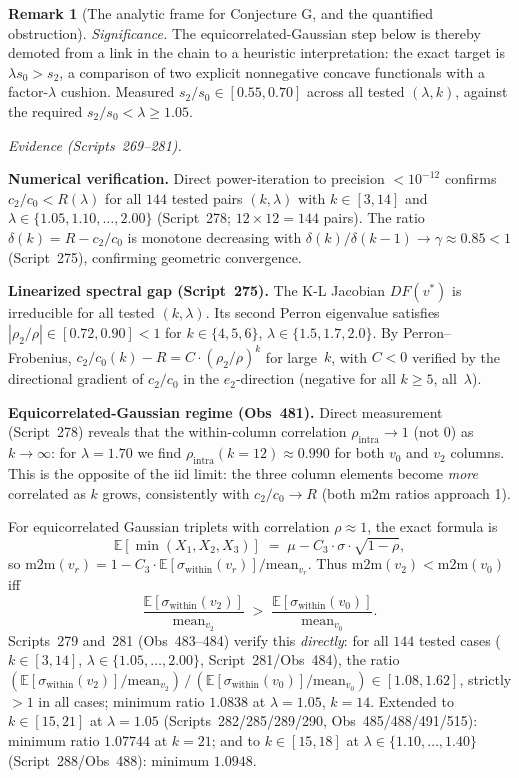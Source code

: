 \documentclass[11pt]{article}
\theoremstyle{definition}
\newtheorem{remark}[theorem]{Remark}
\begin{document}
\begin{remark}[The analytic frame for Conjecture G, and the quantified
obstruction]
\emph{Significance.} The equicorrelated-Gaussian step below is thereby demoted from a
link in the chain to a heuristic interpretation: the exact target is $\lambda s_0>s_2$,
a comparison of two explicit nonnegative concave functionals with a factor-$\lambda$
cushion. Measured $s_2/s_0 \in [0.55,0.70]$ across all tested $(\lambda,k)$,
against the required $s_2/s_0 < \lambda \ge 1.05$.

\emph{Evidence (Scripts~269--281).}

\textbf{Numerical verification.}
Direct power-iteration to precision $<10^{-12}$ confirms
$c_2/c_0 < R(\lambda)$ for all $144$ tested pairs $(k,\lambda)$ with $k\in[3,14]$
and $\lambda\in\{1.05,1.10,\ldots,2.00\}$ (Script~278; $12\times 12=144$ pairs).
The ratio $\delta(k)=R-c_2/c_0$ is monotone decreasing with $\delta(k)/\delta(k-1)\to
\gamma\approx 0.85<1$ (Script~275), confirming geometric convergence.

\textbf{Linearized spectral gap (Script~275).}
The K-L Jacobian $DF(v^*)$ is irreducible for all tested $(k,\lambda)$.
Its second Perron eigenvalue satisfies $|\rho_2/\rho|\in[0.72,0.90]<1$ for
$k\in\{4,5,6\}$, $\lambda\in\{1.5,1.7,2.0\}$.
By Perron--Frobenius, $c_2/c_0(k)-R = C\cdot(\rho_2/\rho)^k$ for large~$k$,
with $C<0$ verified by the directional gradient of $c_2/c_0$ in the $e_2$-direction
(negative for all $k\ge 5$, all~$\lambda$).

\textbf{Equicorrelated-Gaussian regime (Obs~481).}
Direct measurement (Script~278) reveals that the within-column correlation
$\rho_{\mathrm{intra}}\to 1$ (not $0$) as $k\to\infty$: for $\lambda=1.70$
we find $\rho_{\mathrm{intra}}(k=12)\approx 0.990$ for both $v_0$ and $v_2$ columns.
This is the opposite of the iid limit: the three column elements become \emph{more}
correlated as $k$ grows, consistently with $c_2/c_0\to R$ (both m2m ratios approach 1).

For equicorrelated Gaussian triplets with correlation $\rho\approx 1$, the exact formula is
\[
  \mathbb{E}[\min(X_1,X_2,X_3)] \;=\; \mu - C_3\cdot\sigma\cdot\sqrt{1-\rho},
\]
so $\mathrm{m2m}(v_r) = 1 - C_3\cdot\mathbb{E}[\sigma_{\mathrm{within}}(v_r)]/\mathrm{mean}_{v_r}$.
Thus $\mathrm{m2m}(v_2) < \mathrm{m2m}(v_0)$ iff
\[
  \frac{\mathbb{E}[\sigma_{\mathrm{within}}(v_2)]}{\mathrm{mean}_{v_2}} \;>\;
  \frac{\mathbb{E}[\sigma_{\mathrm{within}}(v_0)]}{\mathrm{mean}_{v_0}}.
\]
Scripts~279 and~281 (Obs~483--484) verify this \emph{directly}:
for all $144$ tested cases ($k\in[3,14]$, $\lambda\in\{1.05,\ldots,2.00\}$, Script~281/Obs~484),
the ratio $(\mathbb{E}[\sigma_{\mathrm{within}}(v_2)]/\mathrm{mean}_{v_2})\,/\,
(\mathbb{E}[\sigma_{\mathrm{within}}(v_0)]/\mathrm{mean}_{v_0})\in[1.08,1.62]$,
strictly $> 1$ in all cases; minimum ratio $1.0838$ at $\lambda=1.05$, $k=14$.
Extended to $k\in[15,21]$ at $\lambda=1.05$ (Scripts~282/285/289/290, Obs~485/488/491/515): minimum ratio
$1.07744$ at $k=21$; and to $k\in[15,18]$ at $\lambda\in\{1.10,\ldots,1.40\}$ (Script~288/Obs~488): minimum $1.0948$.


\end{remark}
\end{document}
